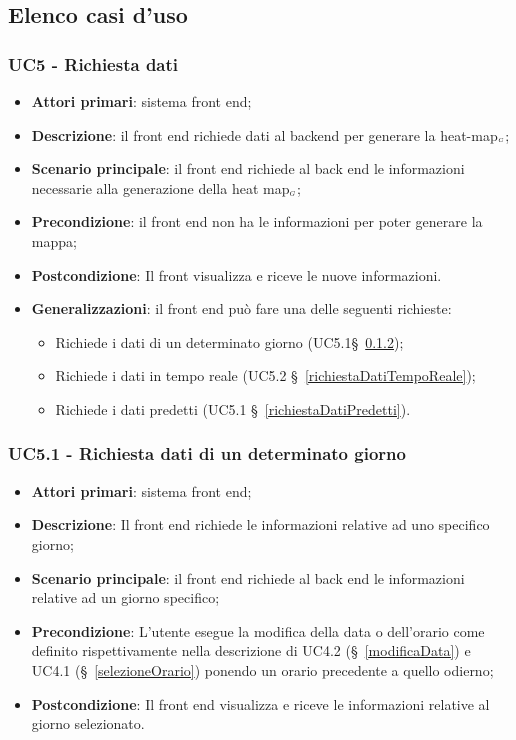 \subsection{Elenco casi d'uso}\label{FBelencoCasiDuso}


\subsubsection{UC5 - Richiesta dati}\label{richiestaDati}
\begin{itemize}
	\item \textbf{Attori primari}: sistema front end;
	\item \textbf{Descrizione}: il front end richiede dati al backend per generare la heat-map$_{\scaleto{G}{3pt}}$;
	\item \textbf{Scenario principale}: il front end richiede al back end le informazioni necessarie alla generazione della heat map$_{\scaleto{G}{3pt}}$;
	\item \textbf{Precondizione}: il front end non ha le informazioni per poter generare la mappa;
	\item \textbf{Postcondizione}: Il front visualizza e riceve le nuove informazioni. 
	\item \textbf{Generalizzazioni}: il front end può fare una delle seguenti richieste:
	\begin{itemize}
		\item Richiede i dati di un determinato giorno (UC5.1\S~\ref{richiestaDatiGiorno});
		\item Richiede i dati in tempo reale (UC5.2 \S~\ref{richiestaDatiTempoReale});
		\item Richiede i dati predetti (UC5.1 \S~\ref{richiestaDatiPredetti}).
	\end{itemize}
\end{itemize}

\subsubsection{UC5.1 - Richiesta dati di un determinato giorno}\label{richiestaDatiGiorno}
\begin{itemize}
	\item \textbf{Attori primari}: sistema front end;
	\item \textbf{Descrizione}: Il front end richiede le informazioni relative ad uno specifico giorno;
	\item \textbf{Scenario principale}:  il front end richiede al back end le informazioni relative ad un giorno specifico;
	\item \textbf{Precondizione}: L’utente esegue la modifica della data o dell’orario come definito rispettivamente nella descrizione di UC4.2 (\S~\ref{modificaData}) e UC4.1 (\S~\ref{selezioneOrario}) ponendo un orario precedente a quello odierno;
	\item \textbf{Postcondizione}: Il front end visualizza e riceve le informazioni relative al giorno selezionato. 
\end{itemize}

